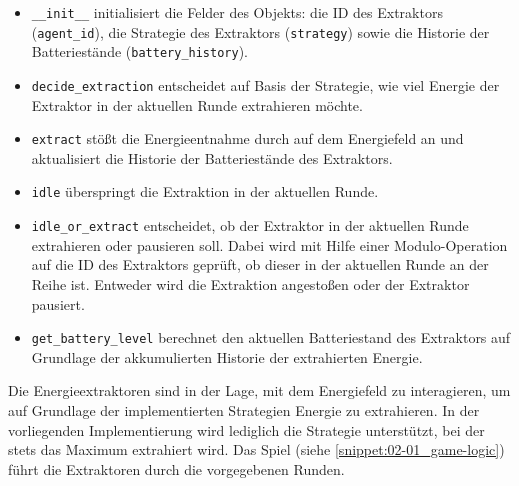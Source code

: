 \begin{itemize}
    \item \texttt{\_\_init\_\_} initialisiert die Felder des Objekts: die ID des Extraktors (\texttt{agent\_id}), die Strategie des Extraktors (\texttt{strategy}) sowie die Historie der Batteriestände (\texttt{battery\_history}).
    \item \texttt{decide\_extraction} entscheidet auf Basis der Strategie, wie viel Energie der Extraktor in der aktuellen Runde extrahieren möchte.
    \item \texttt{extract} stößt die Energieentnahme durch auf dem Energiefeld an und aktualisiert die Historie der Batteriestände des Extraktors.
    \item \texttt{idle} überspringt die Extraktion in der aktuellen Runde.
    \item \texttt{idle\_or\_extract} entscheidet, ob der Extraktor in der aktuellen Runde extrahieren oder pausieren soll. Dabei wird mit Hilfe einer Modulo-Operation auf die ID des Extraktors geprüft, ob dieser in der aktuellen Runde an der Reihe ist. Entweder wird die Extraktion angestoßen oder der Extraktor pausiert.
    \item \texttt{get\_battery\_level} berechnet den aktuellen Batteriestand des Extraktors auf Grundlage der akkumulierten Historie der extrahierten Energie.
\end{itemize}

Die Energieextraktoren sind in der Lage, mit dem Energiefeld zu interagieren, um auf Grundlage der implementierten Strategien Energie zu extrahieren. In der vorliegenden Implementierung wird lediglich die Strategie  unterstützt, bei der stets das Maximum extrahiert wird. Das Spiel (siehe \autoref{snippet:02-01_game-logic}) führt die Extraktoren durch die vorgegebenen Runden.

